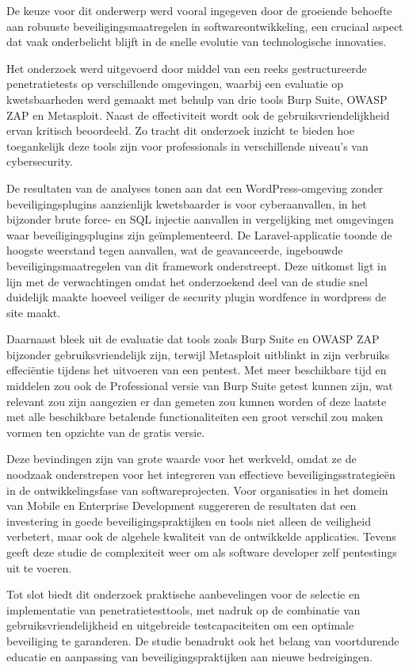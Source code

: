 De keuze voor dit onderwerp werd vooral ingegeven door de groeiende behoefte aan robuuste beveiligingsmaatregelen in softwareontwikkeling, een cruciaal 
aspect dat vaak onderbelicht blijft in de snelle evolutie van technologische innovaties. 

Het onderzoek werd uitgevoerd door middel van een reeks gestructureerde penetratietests op verschillende omgevingen, waarbij een evaluatie op 
kwetsbaarheden werd gemaakt met behulp van drie tools Burp Suite, OWASP ZAP en Metasploit. Naast de effectiviteit wordt ook de gebruiksvriendelijkheid 
ervan kritisch beoordeeld. Zo tracht dit onderzoek inzicht te bieden hoe toegankelijk deze tools zijn voor professionals in verschillende 
niveau's van cybersecurity.

De resultaten van de analyses tonen aan dat een WordPress-omgeving zonder beveiligingsplugins aanzienlijk kwetsbaarder is voor cyberaanvallen, in het bijzonder  
brute force- en SQL injectie aanvallen in vergelijking met omgevingen waar beveiligingsplugins zijn geïmplementeerd. De Laravel-applicatie toonde 
de hoogste weerstand tegen aanvallen, wat de geavanceerde, ingebouwde beveiligingsmaatregelen van dit framework onderstreept.
Deze uitkomst ligt in lijn met de verwachtingen omdat het onderzoekend deel van de studie snel duidelijk maakte hoeveel veiliger 
de security plugin wordfence in wordpress de site maakt.

Daarnaast bleek uit de evaluatie dat tools zoals Burp Suite en OWASP ZAP bijzonder gebruiksvriendelijk zijn, terwijl Metasploit 
uitblinkt in zijn verbruiks effeciëntie tijdens het uitvoeren van een pentest. Met meer beschikbare tijd en middelen zou ook 
de Professional versie van Burp Suite getest kunnen zijn, wat relevant zou zijn aangezien er dan gemeten zou kunnen worden of deze 
laatste met alle beschikbare betalende functionaliteiten een groot verschil zou maken vormen ten opzichte van de gratis versie.

Deze bevindingen zijn van grote waarde voor het werkveld, omdat ze de noodzaak onderstrepen voor het integreren van effectieve 
beveiligingsstrategieën in de ontwikkelingsfase van softwareprojecten. Voor organisaties in het domein van Mobile en Enterprise 
Development suggereren de resultaten dat een investering in goede beveiligingspraktijken en tools niet alleen de veiligheid 
verbetert, maar ook de algehele kwaliteit van de ontwikkelde applicaties. Tevens geeft deze studie de complexiteit weer 
om als software developer zelf pentestings uit te voeren.

Tot slot biedt dit onderzoek praktische aanbevelingen voor de selectie en implementatie van penetratietesttools, met 
nadruk op de combinatie van gebruiksvriendelijkheid en uitgebreide testcapaciteiten om een optimale beveiliging te 
garanderen. De studie benadrukt ook het belang van voortdurende educatie en aanpassing van beveiligingspraktijken aan nieuwe 
bedreigingen.
